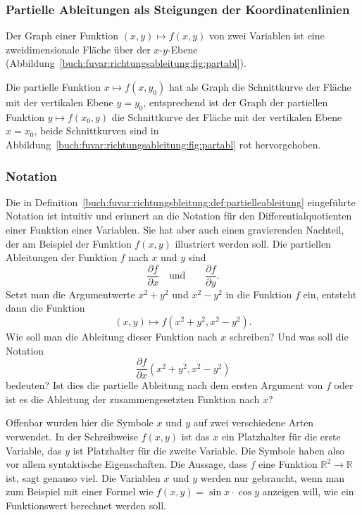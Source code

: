 %
%
\subsubsection{Partielle Ableitungen als Steigungen der Koordinatenlinien}
Der Graph einer Funktion $(x,y)\mapsto f(x,y)$ von zwei Variablen ist 
eine zweidimensionale Fläche über der $x$-$y$-Ebene
(Abbildung~\ref{buch:fuvar:richtungsableitung:fig:partabl}).

Die partielle Funktion $x\mapsto f(x,y_0)$ hat als Graph die Schnittkurve
der Fläche mit der vertikalen Ebene $y=y_0$, entsprechend ist der Graph
der partiellen Funktion $y\mapsto f(x_0,y)$ die Schnittkurve der Fläche
mit der vertikalen Ebene $x=x_0$, beide Schnittkurven sind in
Abbildung~\ref{buch:fuvar:richtungsableitung:fig:partabl} rot hervorgehoben.

%
%
\subsubsection{Notation}
Die in Definition~\ref{buch:fuvar:richtungsbleitung:def:partielleableitung}
eingeführte Notation ist intuitiv und erinnert an die Notation für den
Differentialquotienten einer Funktion einer Variablen.
Sie hat aber auch einen gravierenden Nachteil, der am Beispiel
der Funktion $f(x,y)$ illustriert werden soll.
Die partiellen Ableitungen der Funktion $f$ nach $x$ und $y$ sind
\[
\frac{\partial f}{\partial x}
\quad\text{und}\qquad
\frac{\partial f}{\partial y}.
\]
Setzt man die Argumentwerte $x^2+y^2$ und $x^2-y^2$ in die Funktion
$f$ ein, entsteht dann die Funktion
\begin{equation}
(x,y) \mapsto f(x^2+y^2,x^2-y^2).
\label{buch:fuvar:richtungsableitung:eqn:feingesetzt}
\end{equation}
Wie soll man die Ableitung dieser Funktion nach $x$ schreiben?
Und was soll die Notation
\[
\frac{\partial f}{\partial x}(x^2+y^2,x^2-y^2)
\]
bedeuten?
Ist dies die partielle Ableitung nach dem ersten Argument von $f$
oder ist es die Ableitung der zusammengesetzten Funktion nach $x$?

Offenbar wurden hier die Symbole $x$ und $y$ auf zwei verschiedene
Arten verwendet.
In der Schreibweise $f(x,y)$ ist das $x$ ein Platzhalter für die
erste Variable, das $y$ ist Platzhalter für die zweite Variable.
Die Symbole haben also vor allem syntaktische Eigenschaften.
Die Aussage, dass $f$ eine Funktion $\mathbb{R}^2\to\mathbb{R}$
ist, sagt genauso viel.
Die Variablen $x$ und $y$ werden nur gebraucht, wenn man zum
Beispiel mit einer Formel wie $f(x,y)=\sin x\cdot\cos y$ 
anzeigen will, wie ein Funktionswert berechnet werden soll.


